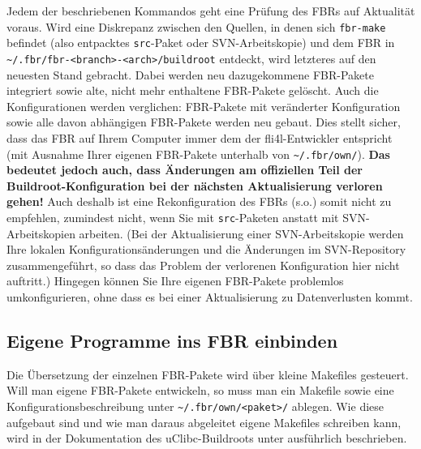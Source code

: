 Jedem der beschriebenen Kommandos geht eine Prüfung des FBRs auf Aktualität
voraus. Wird eine Diskrepanz zwischen den Quellen, in denen sich
\texttt{fbr-make} befindet (also entpacktes \texttt{src}-Paket oder
SVN-Arbeitskopie) und dem FBR in
\texttt{\~{}/.fbr/fbr-<branch>-<arch>/buildroot} entdeckt, wird letzteres auf
den neuesten Stand gebracht. Dabei werden neu dazugekommene FBR-Pakete
integriert sowie alte, nicht mehr enthaltene FBR-Pakete gelöscht. Auch die
Konfigurationen werden verglichen: FBR-Pakete mit veränderter Konfiguration
sowie alle davon abhängigen FBR-Pakete werden neu gebaut. Dies stellt sicher,
dass das FBR auf Ihrem Computer immer dem der fli4l-Entwickler entspricht (mit
Ausnahme Ihrer eigenen FBR-Pakete unterhalb von \texttt{\~{}/.fbr/own/}).
\textbf{Das bedeutet jedoch auch, dass Änderungen am offiziellen Teil der
Buildroot-Konfiguration bei der nächsten Aktualisierung verloren gehen!} Auch
deshalb ist eine Rekonfiguration des FBRs (s.o.) somit nicht zu empfehlen,
zumindest nicht, wenn Sie mit \texttt{src}-Paketen anstatt mit SVN-Arbeitskopien
arbeiten. (Bei der Aktualisierung einer SVN-Arbeitskopie werden Ihre lokalen
Konfigurationsänderungen und die Änderungen im SVN-Repository zusammengeführt,
so dass das Problem der verlorenen Konfiguration hier nicht auftritt.) Hingegen
können Sie Ihre eigenen FBR-Pakete problemlos umkonfigurieren, ohne dass es bei
einer Aktualisierung zu Datenverlusten kommt.

\subsection{Eigene Programme ins FBR einbinden}

Die Übersetzung der einzelnen FBR-Pakete wird über kleine Makefiles
gesteuert. Will man eigene FBR-Pakete entwickeln, so muss man ein Makefile sowie
eine Konfigurationsbeschreibung unter \texttt{\~{}/.fbr/own/<paket>/} ablegen.
Wie diese aufgebaut sind und wie man daraus abgeleitet eigene Makefiles
schreiben kann, wird in der Dokumentation des uClibc-Buildroots unter
ausführlich beschrieben.
